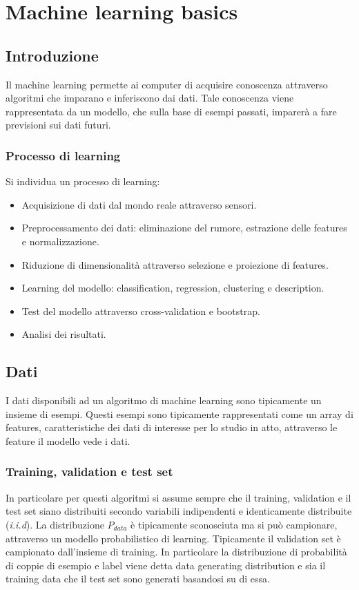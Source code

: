 \chapter{Machine learning basics}

\section{Introduzione}
Il machine learning permette ai computer di acquisire conoscenza attraverso algoritmi che imparano e inferiscono dai dati.
Tale conoscenza viene rappresentata da un modello, che sulla base di esempi passati, imparerà a fare previsioni sui dati futuri.

\subsection{Processo di learning}
Si individua un processo di learning:
\begin{multicols}{2}
	\begin{itemize}
		\item Acquisizione di dati dal mondo reale attraverso sensori.
		\item Preprocessamento dei dati: eliminazione del rumore, estrazione delle features e normalizzazione.
		\item Riduzione di dimensionalit\`a attraverso selezione e proiezione di features.
		\item Learning del modello: classification, regression, clustering e description.
		\item Test del modello attraverso cross-validation e bootstrap.
		\item Analisi dei risultati.
	\end{itemize}
\end{multicols}

\section{Dati}
I dati disponibili ad un algoritmo di machine learning sono tipicamente un insieme di esempi.
Questi esempi sono tipicamente rappresentati come un array di features, caratteristiche dei dati di interesse per lo studio in atto, attraverso le feature il modello vede i dati.

\subsection{Training, validation e test set}
In particolare per questi algoritmi si assume sempre che il training, validation e il test set siano distribuiti secondo variabili indipendenti e identicamente distribuite (\emph{i.i.d}).
La distribuzione $P_{data}$ \`e tipicamente sconosciuta ma si pu\`o campionare, attraverso un modello probabilistico di learning. Tipicamente il validation set \`e campionato dall'insieme di training.
In particolare la distribuzione di probabilit\`a di coppie di esempio e label viene detta data generating distribution e sia il training data che il test set sono generati basandosi su di essa.

